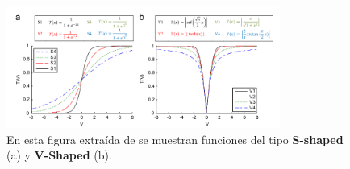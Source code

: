 \begin{figure}[H]
  \begin{center}
    \includegraphics[width=0.8\textwidth]{imagenes/transfer_functions.png}
  \end{center}
  \caption[Funciones de transferencia]{En esta figura extraída de \cite{mirjalili_s-shaped_2013} se muestran funciones del tipo \textbf{S-shaped} (a) y \textbf{V-Shaped} (b).}
\end{figure}